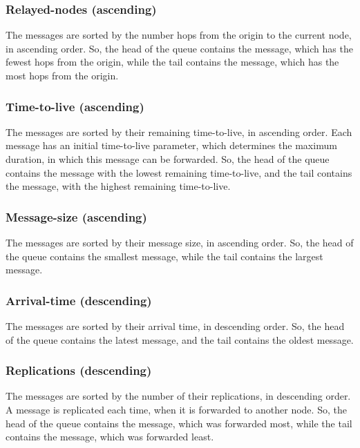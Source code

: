\documentclass[conference,10pt,letterpaper,final]{IEEEtran}
\begin{document}
\vspace{0.2cm}
\subsubsection{Relayed-nodes (ascending)}
The messages are sorted by the number hops from the origin to the current node, in ascending order.
So, the head of the queue contains the message, which has the fewest hops from the origin, while the tail contains the message, which has the most hops from the origin.

\vspace{0.2cm}
\subsubsection{Time-to-live (ascending)}
The messages are sorted by their remaining time-to-live, in ascending order.
Each message has an initial time-to-live parameter, which determines the maximum duration, in which this message can be forwarded.
So, the head of the queue contains the message with the lowest remaining time-to-live, and the tail contains the message, with the highest remaining time-to-live.

\vspace{0.2cm}
\subsubsection{Message-size (ascending)}
The messages are sorted by their message size, in ascending order.
So, the head of the queue contains the smallest message, while the tail contains the largest message.


\vspace{0.2cm}
\subsubsection{Arrival-time (descending)}
The messages are sorted by their arrival time, in descending order.
So, the head of the queue contains the latest message, and the tail contains the oldest message.

\vspace{0.2cm}
\subsubsection{Replications (descending)}
The messages are sorted by the number of their replications, in descending order.
A message is replicated each time, when it is forwarded to another node.
So, the head of the queue contains the message, which was forwarded most, while the tail contains the message, which was forwarded least.
\end{document}
